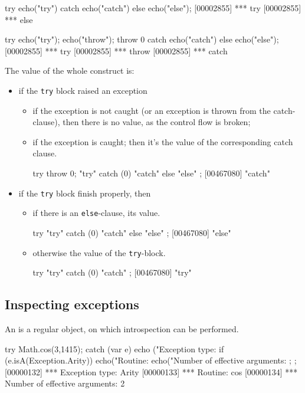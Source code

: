 \begin{urbiscript}
try   { echo("try") }
catch { echo("catch")}
else  { echo("else")};
[00002855] *** try
[00002855] *** else

try   { echo("try"); echo("throw"); throw 0 }
catch { echo("catch")}
else  { echo("else")};
[00002855] *** try
[00002855] *** throw
[00002855] *** catch
\end{urbiscript}

The value of the whole construct is:
\begin{itemize}
\item if the \lstinline{try} block raised an exception
  \begin{itemize}
  \item if the exception is not caught (or an exception is thrown from the
    catch-clause), then there is no value, as the control flow is broken;
  \item if the exception is caught; then it's the value of the corresponding
    catch clause.
\begin{urbiscript}
try { throw 0; "try" } catch (0) { "catch" } else { "else" };
[00467080] "catch"
\end{urbiscript}
  \end{itemize}
\item if the \lstinline{try} block finish properly, then
  \begin{itemize}
  \item if there is an \lstinline{else}-clause, its value.
\begin{urbiscript}
try { "try" } catch (0) { "catch" } else { "else" };
[00467080] "else"
\end{urbiscript}
  \item otherwise the value of the \lstinline{try}-block.
\begin{urbiscript}
try { "try" } catch (0) { "catch" };
[00467080] "try"
\end{urbiscript}
  \end{itemize}
\end{itemize}


\subsection{Inspecting exceptions}

An  is a regular object, on which introspection
can be performed.

\begin{urbiscript}
try
{
  Math.cos(3,1415);
}
catch (var e)
{
  echo ("Exception type: %
  if (e.isA(Exception.Arity))
  {
    echo("Routine: %
    echo("Number of effective arguments: %
  };
};
[00000132] *** Exception type: Arity
[00000133] *** Routine: cos
[00000134] *** Number of effective arguments: 2
\end{urbiscript}

